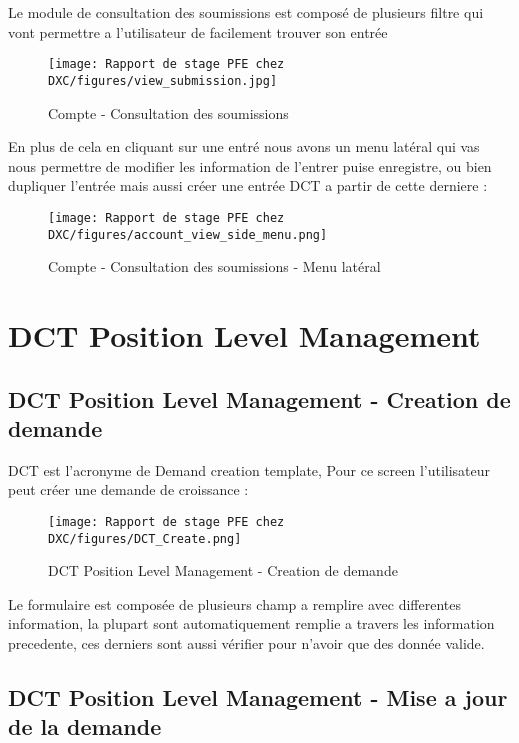 Le module de consultation des soumissions est composé de plusieurs filtre qui vont permettre a l'utilisateur de facilement trouver son entrée 

\begin{figure}[H]
    \centering
    \texttt{[image: Rapport de stage PFE chez DXC/figures/view\_submission.jpg]}
    \caption{Compte - Consultation des soumissions}
\end{figure}

En plus de cela en cliquant sur une entré nous avons un menu latéral qui vas nous permettre de modifier les information de l'entrer puise enregistre, ou bien 
dupliquer l'entrée mais aussi créer une entrée DCT a partir de cette derniere :

\begin{figure}[H]
    \centering
    \texttt{[image: Rapport de stage PFE chez DXC/figures/account\_view\_side\_menu.png]}
    \caption{Compte - Consultation des soumissions - Menu latéral}
\end{figure}

\section{DCT Position Level Management}

\subsection{DCT Position Level Management - Creation de demande}

DCT est l'acronyme de Demand creation template, Pour ce screen l'utilisateur peut créer une demande de croissance : 

\begin{figure}[H]
    \centering
    \texttt{[image: Rapport de stage PFE chez DXC/figures/DCT\_Create.png]}
    \caption{DCT Position Level Management - Creation de demande }
\end{figure}

Le formulaire est composée de plusieurs champ a remplire avec differentes information, la plupart sont automatiquement remplie a travers les information precedente, ces derniers sont aussi vérifier pour n'avoir que des donnée valide.

\subsection{DCT Position Level Management - Mise a jour de la demande}

